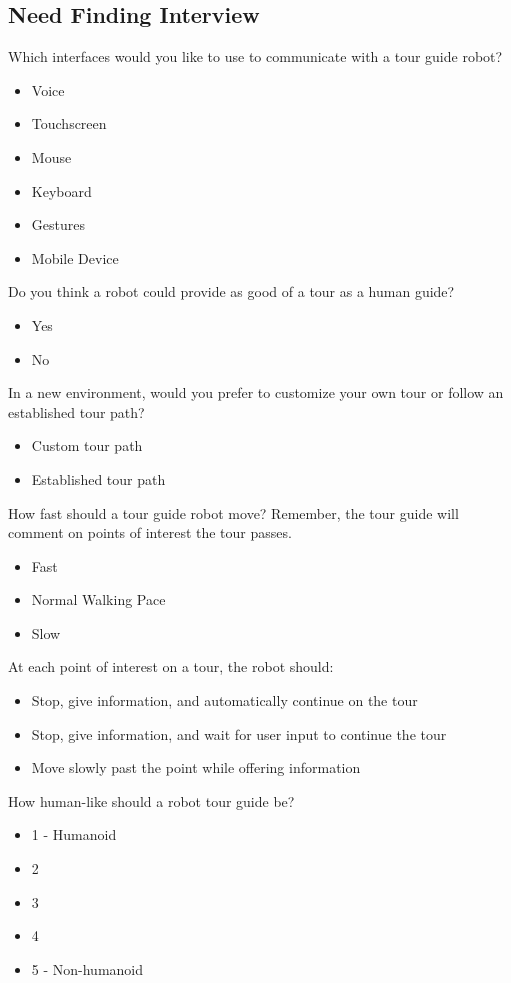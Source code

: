 \documentclass[11pt]{report}
\begin{document}
\begin{appendices}
\chapter{Need Finding Interview}
\label{appendix:A}
Which interfaces would you like to use to communicate with a tour guide robot?
\begin{itemize}
 \item Voice
 \item Touchscreen
 \item Mouse
 \item Keyboard
 \item Gestures
 \item Mobile Device
\end{itemize}

Do you think a robot could provide as good of a tour as a human guide?
\begin{itemize}
 \item Yes
 \item No
\end{itemize}

In a new environment, would you prefer to customize your own tour or follow an established tour path? 
\begin{itemize}
 \item  Custom tour path
 \item Established tour path
\end{itemize}

How fast should a tour guide robot move? Remember, the tour guide will comment on points of interest the tour passes.
\begin{itemize}
 \item  Fast
 \item Normal Walking Pace
 \item Slow
\end{itemize}

At each point of interest on a tour, the robot should:
\begin{itemize}
 \item Stop, give information, and automatically continue on the tour
 \item Stop, give information, and wait for user input to continue the tour
 \item Move slowly past the point while offering information
\end{itemize}

How human-like should a robot tour guide be? 
\begin{itemize}
 \item 1 - Humanoid
 \item 2
 \item 3
 \item 4
 \item 5 - Non-humanoid
\end{itemize}


\end{appendices}
\end{document}

